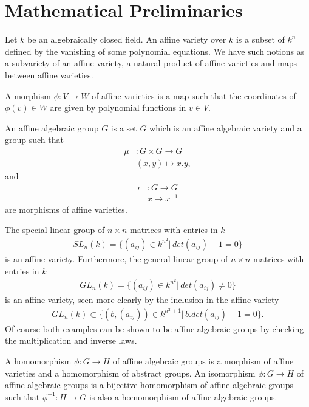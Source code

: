 
\chapter{Mathematical Preliminaries}
\label{Chapter2}

Let $k$ be an algebraically closed field. An affine variety over $k$ is a subset of $k^n$ defined by the vanishing of some polynomial equations. We have such notions as a subvariety of an affine variety, a natural product of affine varieties and maps between affine varieties.

A morphism $\phi:V \rightarrow W$ of affine varieties is a map such that the coordinates of $\phi(v) \in W$ are given by polynomial functions in $v \in V$.

An affine algebraic group $G$ is a set $G$ which is an affine algebraic variety and a group such that
\begin{align*}
	\mu&:  G \times G \rightarrow G\\
	& (x,y) \mapsto x.y,
\end{align*}
and
\begin{align*}
	\iota&:  G \rightarrow G \\
	& x \mapsto x^{-1}
\end{align*}
are morphisms of affine varieties.

\begin{example}
	The special linear group of $n\times n$ matrices with entries in $k$
	\begin{align}
		SL_n(k) = \{(a_{ij}) \in k^{n^2} |\, det(a_{ij}) - 1 = 0\}
	\end{align}
	is an affine variety. Furthermore, the general linear group of $n\times n$ matrices with entries in $k$
	\begin{align}
		GL_n(k) = \{(a_{ij}) \in k^{n^2} |\, det(a_{ij}) \neq 0\}
	\end{align}
	is an affine variety, seen more clearly by the inclusion in the affine variety
	\begin{align}
		GL_n(k)\subset \{(b, (a_{ij})) \in k^{n^2 + 1} |\, b.det(a_{ij}) - 1 = 0\}.
	\end{align}
	Of course both examples can be shown to be affine algebraic groups by checking the multiplication and inverse laws.
\end{example}

A homomorphism $\phi: G\rightarrow H$ of affine algebraic groups is a morphism of affine varieties and a homomorphism of abstract groups. An isomorphism $\phi: G\rightarrow H$ of affine algebraic groups is a bijective homomorphism of affine algebraic groups such that $\phi^{-1}:H\rightarrow G$ is also a homomorphism of affine algebraic groups.

